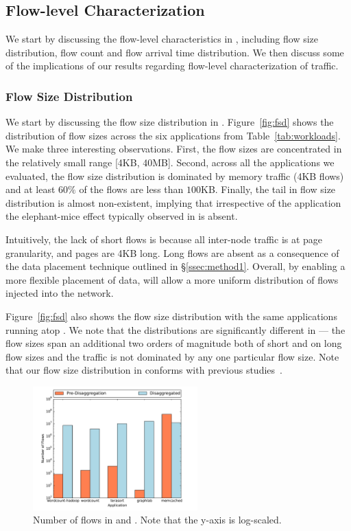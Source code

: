 \subsection{Flow-level Characterization} 
\label{ssec:flc}
We start by discussing the flow-level characteristics in \dis, including flow size distribution, flow count and flow arrival time distribution. We then discuss some of the implications of our results regarding flow-level characterization of \dis traffic.

\subsubsection{Flow Size Distribution}
We start by discussing the flow size distribution in \dis. Figure~\ref{fig:fsd} shows the distribution of flow sizes across the six applications from Table~\ref{tab:workloads}. We make three interesting observations. First, the flow sizes are concentrated in the relatively small range [4KB, 40MB]. Second, across all the applications we evaluated, the flow size distribution is dominated by memory traffic (4KB flows) and at least $60\%$ of the flows are less than $100$KB. Finally, the tail in flow size distribution is almost non-existent, implying that irrespective of the application the elephant-mice effect typically observed in \pdis is absent.

Intuitively, the lack of short flows is because all inter-node traffic is at page granularity, and pages are 4KB long. Long flows are absent as a consequence of the data placement technique outlined in \S\ref{ssec:method1}. Overall, by enabling a more flexible placement of data, \dis will allow a more uniform distribution of flows injected into the network.

Figure~\ref{fig:fsd} also shows the flow size distribution with the same applications running atop \pdis. We note that the distributions are significantly different in \pdis --- the flow sizes span an additional two orders of magnitude both of short and on long flow sizes and the traffic is not dominated by any one particular flow size. Note that our flow size distribution in \pdis conforms with previous studies~\cite{srikanth, theo}.

%
\begin{figure}
  \centering
    \includegraphics[width = 2.5in]{img/graph2_numflows} 
  \caption{\small{Number of flows in \dis and \pdis. Note that the y-axis is log-scaled.}}
  \label{fig:nof}
\end{figure}
%
%
